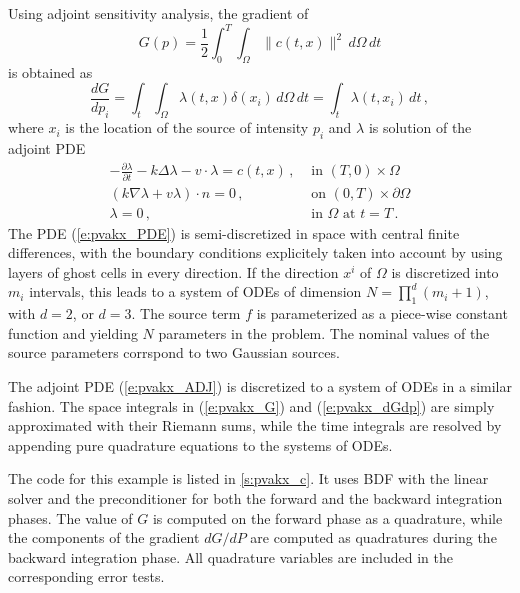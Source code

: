 Using adjoint sensitivity analysis, the gradient of
\begin{equation}\label{e:pvakx_G}
  G(p) = \frac{1}{2} \int_0^T \int_\Omega \| c(t,x) \|^2 \, d\Omega \, dt
\end{equation}
is obtained as
\begin{equation}\label{e:pvakx_dGdp}
  \frac{dG}{dp_i} = \int_t \int_\Omega \lambda(t,x) \delta(x_i) \, d\Omega \, dt
  = \int_t \lambda(t,x_i) \, dt \, ,
\end{equation}
where $x_i$ is the location of the source of intensity $p_i$ and $\lambda$
is solution of the adjoint PDE
\begin{equation}\label{e:pvakx_ADJ}
  \begin{split}
    - \frac{\partial\lambda}{\partial t} - k \Delta\lambda - v \cdot \lambda = c(t,x)  \, ,
    &\text{ in } (T,0) \times \Omega \\
    (k \nabla\lambda + v \lambda) \cdot n = 0 \, ,
    &\text{ on } (0,T) \times \partial\Omega \\
    \lambda = 0 \, ,
    &\text{ in } \Omega \text{ at } t = T \, .
  \end{split}
\end{equation}
The PDE (\ref{e:pvakx_PDE}) is semi-discretized in space with central finite differences,
with the boundary conditions explicitely taken into account by using layers of ghost cells 
in every direction. If the direction $x^i$ of $\Omega$ is discretized into $m_i$
intervals, this leads to a system of ODEs of dimension 
$N = \prod_1^d (m_i+1)$, with $d=2$, or $d=3$.
The source term $f$ is parameterized as a piece-wise constant function and yielding
$N$ parameters in the problem. The nominal values of the source parameters corrspond
to two Gaussian sources.

The adjoint PDE (\ref{e:pvakx_ADJ}) is discretized to a system of ODEs in a similar fashion.
The space integrals in (\ref{e:pvakx_G}) and (\ref{e:pvakx_dGdp}) are simply approximated
with their Riemann sums, while the time integrals are resolved by appending pure quadrature
equations to the systems of ODEs.

The code for this example is listed in \A\ref{s:pvakx_c}. It uses BDF with the {\cvspgmr}
linear solver and the {\cvbbdpre} preconditioner for both the forward and the backward
integration phases. The value of $G$ is computed on the forward phase as a quadrature,
while the components of the gradient $dG/dP$ are computed as quadratures during the
backward integration phase. All quadrature variables are included in the corresponding 
error tests.

